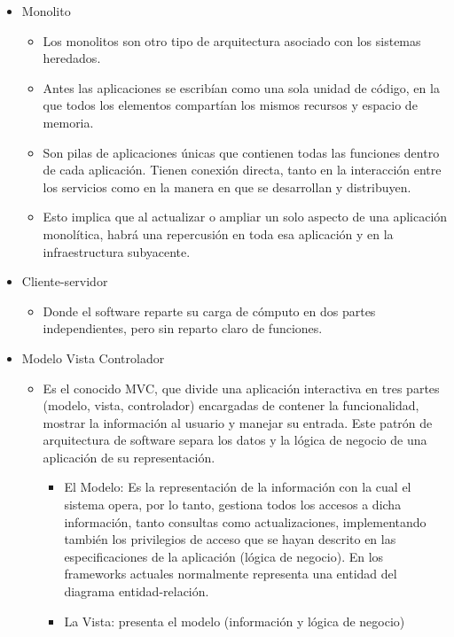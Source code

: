 \documentclass[12pt, twoside, openright]{report} %
\begin{document}
\begin{itemize}
	\item Monolito
		\begin{itemize}
			\item
				Los monolitos son otro tipo de arquitectura asociado con los
				sistemas heredados.
			\item
				Antes las aplicaciones se escribían como una sola unidad de
				código, en la que todos los elementos compartían los mismos
				recursos y espacio de memoria.
			\item
				Son pilas de aplicaciones únicas que contienen todas las funciones
				dentro de cada aplicación. Tienen conexión directa, tanto en la
				interacción entre los servicios como en la manera en que se
				desarrollan y distribuyen.
			\item
				Esto implica que al actualizar o ampliar un solo aspecto de una
				aplicación monolítica, habrá una repercusión en toda esa
				aplicación y en la infraestructura subyacente.
		\end{itemize}
	\item Cliente-servidor
		\begin{itemize}
			\item Donde el software reparte su carga de cómputo en dos partes
				independientes, pero sin reparto claro de funciones.
		\end{itemize}
	\item Modelo Vista Controlador
		\begin{itemize}
			\item Es el conocido MVC, que divide una aplicación interactiva en tres
				partes (modelo, vista, controlador) encargadas de contener la
				funcionalidad, mostrar la información al usuario y manejar su
				entrada. Este patrón de arquitectura de software separa los datos
				y la lógica de negocio de una aplicación de su representación.
					\begin{itemize}
						\item
						El Modelo: Es la representación de la información con la cual el
						sistema opera, por lo tanto, gestiona todos los accesos a dicha
						información, tanto consultas como actualizaciones, implementando
						también los privilegios de acceso que se hayan descrito en las
						especificaciones de la aplicación (lógica de negocio). En los
						frameworks actuales normalmente representa una entidad del
						diagrama entidad-relación.
						\item
						La Vista: presenta el modelo (información y lógica de negocio)

\end{itemize}
\end{itemize}
\end{itemize}
\end{document}
